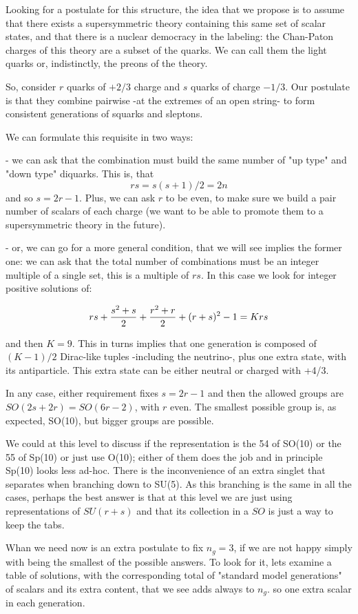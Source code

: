 \documentclass[a4paper]{article}
\begin{document}
Looking for a postulate for this structure, the idea that we propose
is to assume that there exists a
supersymmetric theory containing this same set of scalar states, and that there is 
a nuclear democracy in the labeling: the Chan-Paton charges of this theory are 
a subset of the quarks.  We can call them the light quarks or, indistinctly,
the preons of the theory.

So, consider $r$ quarks of $+2/3$ charge and $s$ quarks of charge $-1/3$. Our postulate is that they combine pairwise -at the extremes of an open string- to form consistent generations of squarks and sleptons. 

We can formulate this requisite in two ways:

- we can ask that the combination must build the same number of "up type" and "down type" diquarks. This is, that $$rs = s(s+1)/2 = 2n$$ and so $ s= 2 r -1$. Plus, we can ask $r$ to be even, to make sure we build a pair number of scalars of each charge (we want to be able to promote them to a supersymmetric theory in the future).

- or, we can go for a more general condition, that we will see implies the former one: we can ask that the total number of combinations must be an integer multiple of a single set, this is a multiple of $rs$.  In this case we look for integer positive solutions of:

$$rs + {s^2+s \over 2} + {r^2 + r \over 2} + (r+s)^2 -1 = K rs$$

and then $K=9$. This in turns implies that one generation is composed of $(K-1)/2$
Dirac-like tuples -including the neutrino-,
plus one extra state, with its antiparticle. This extra state can be
either neutral or charged with +4/3. 

In any case, either requirement fixes $s=2 r -1$ and then the allowed groups are 
$SO(2s+2r)=SO(6r -2)$, with $r$  even. The smallest possible group is,
as expected, SO(10), but bigger groups are possible. 

We could at this level to discuss if the representation is the
54 of SO(10) or the 55 of Sp(10) or just use O(10); either of them does
the job and in principle Sp(10) looks less ad-hoc. There is the inconvenience 
of an extra singlet that separates when branching down to SU(5). As this
branching is the same in all the cases, perhaps the best answer is
that at this level we are just using representations of $SU(r+s)$ and
that its collection in a $SO$ is just a way to keep the tabs.

Whan we need now is an extra postulate to fix $n_g=3$, if we are not
happy simply with being the smallest of the possible answers. 
To look for it, lets examine a
table of solutions, with the corresponding total of "standard model
generations" of scalars and its extra content, that we see adds always to $n_g$.
so one extra scalar in each generation.
\end{document}
